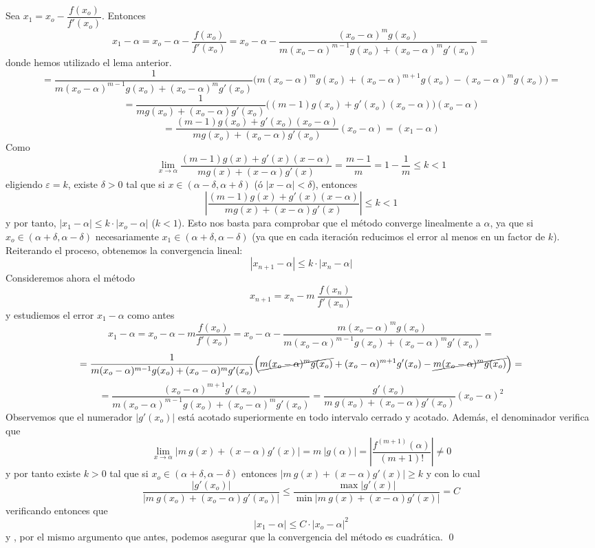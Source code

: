         \begin{dem}
        Sea $x_1=x_o-\dfrac{f(x_o)}{f'(x_o)}$. Entonces
        $$x_1-\alpha=x_o-\alpha-\dfrac{f(x_o)}{f'(x_o)}=x_o-\alpha-\dfrac{(x_o-\alpha)^m g(x_o)}{m(x_o-\alpha)^{m-1}g(x_o)+(x_o-\alpha)^m g'(x_o)}=$$
        donde hemos utilizado el lema anterior. 
        $$=\dfrac{1}{m(x_o-\alpha)^{m-1}g(x_o)+(x_o-\alpha)^m g'(x_o)}\Big(m(x_o-\alpha)^m g(x_o)+(x_o-\alpha)^{m+1}g(x_o)-(x_o-\alpha)^m g(x_o)\Big)=$$ $$=\dfrac{1}{m g(x_o)+(x_o-\alpha) g'(x_o)}\Big( (m-1) g(x_o)+g'(x_o)(x_o-\alpha)\Big)(x_o-\alpha) $$
        $$=\dfrac{(m-1)g(x_o)+g'(x_o)(x_o-\alpha)}{m g(x_o)+(x_o-\alpha)g'(x_o)}(x_o-\alpha)=(x_1-\alpha)$$
        Como
        $$\lim_{x\to\alpha}\dfrac{(m-1)g(x)+g'(x)(x-\alpha)}{m g(x)+(x-\alpha)g'(x)}=\dfrac{m-1}{m}=1-\dfrac{1}{m} \leq k < 1$$
        eligiendo $\varepsilon=k$, existe $\delta > 0$ tal que si $x \in (\alpha-\delta, \alpha+\delta)$ (ó $|x-\alpha| < \delta$), entonces 
        $$\left|\dfrac{(m-1)g(x)+g'(x)(x-\alpha)}{m g(x)+(x-\alpha)g'(x)} \right| \leq k < 1 $$
        y por tanto, $|x_1-\alpha| \leq k \cdot |x_o-\alpha|$  ($k <1$). Esto nos basta para comprobar que el método converge linealmente a $\alpha$, ya que si $x_o\in(\alpha+\delta,\alpha-\delta)$ necesariamente $x_1\in(\alpha+\delta,\alpha-\delta)$ (ya que en cada iteración reducimos el error al menos en un factor de $k$). Reiterando el proceso, obtenemos la convergencia lineal: 
        $$|x_{n+1}-\alpha|\leq k \cdot|x_n -\alpha|$$
        Consideremos ahora el método
        $$x_{n+1}=x_n- m\: \dfrac{f(x_n)}{f'(x_n)}$$
        y estudiemos el error $x_1-\alpha$ como antes
        $$x_1-\alpha=x_o-\alpha- m \dfrac{f(x_o)}{f'(x_o)}=x_o-\alpha-\dfrac{m(x_o-\alpha)^m g(x_o)}{m(x_o-\alpha)^{m-1}g(x_o)+(x_o-\alpha)^m g'(x_o)}=$$
         $$=\dfrac{1}{m(x_o-\alpha)^{m-1}g(x_o)+(x_o-\alpha)^m g'(x_o)}\Big(\cancel{m(x_o-\alpha)^m g(x_o)}+(x_o-\alpha)^{m+1}g'(x_o)-\cancel{m(x_o-\alpha)^m g(x_o)}\Big)=$$ $$=\dfrac{(x_o-\alpha)^{m+1}g'(x_o)}{m (x_o-\alpha)^{m-1}g(x_o)+(x_o-\alpha)^m g'(x_o)} =\dfrac{g'(x_o)}{m \:g(x_o)+(x_o-\alpha)g'(x_o)}(x_o-\alpha)^2$$
         Observemos que el numerador $|g'(x_o)|$ está acotado superiormente en todo intervalo cerrado y acotado. Además, el denominador verifica que 
         $$\lim_{x\to \alpha}|m \: g(x)+(x-\alpha)g'(x)|=m \: |g(\alpha)|=\left|\dfrac{f^{(m+1)}(\alpha)}{(m+1)!}\right| \neq 0$$
        y por tanto existe $k>0$ tal que si $x_o\in(\alpha+\delta,\alpha-\delta)$ entonces $|m \: g(x)+(x-\alpha)g'(x)|\geq k$ y con lo cual 
        $$\dfrac{|g'(x_o)|}{|m \:g(x_o)+(x_o-\alpha)g'(x_o)|} \leq \dfrac{\max|g'(x)|}{\min|m \:g(x)+(x-\alpha)g'(x)|}=C$$
        verificando entonces que 
        $$|x_1-\alpha|\leq C \cdot |x_o-\alpha|^2$$
        y , por el mismo argumento que antes, podemos asegurar que la convergencia del método es cuadrática. 
        \qed\end{dem}
